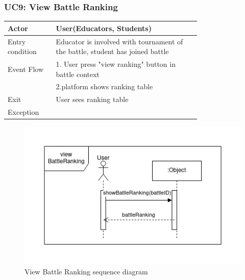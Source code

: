 \newpage
\subsubsection{UC9: View Battle Ranking}
\begin{center}
    \begin{longtable}{lp{0.75\linewidth}}
        \hline
            Actor & User(Educators, Students)\\
        \hline
            Entry condition & Educator is involved with tournament of the battle, student has joined battle\\
        \hline
            Event Flow & 1. User press "view ranking" button in battle context\\
                       & 2.platform shows ranking table\\
        \hline
            Exit & User sees ranking table\\
        \hline
            Exception & \\
        \hline
    \end{longtable}
\end{center}

\begin{figure}[H]
    \centering
    \includegraphics[width=1\linewidth]{misc//Images//UC Diagrams/UC9.png}
    \caption{View Battle Ranking sequence diagram}
    \label{fig:enter-label}
\end{figure}

\newpage
